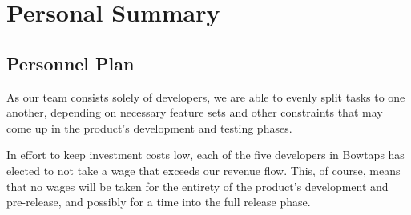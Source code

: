 

\chapter{Personal Summary}

\section{Personnel Plan}

As our team consists solely of developers, we are able to evenly split tasks to one another, depending on necessary feature sets and other constraints that may come up in the product’s development and testing phases.

In effort to keep investment costs low, each of the five developers in Bowtaps has elected to not take a wage that exceeds our revenue flow. This, of course, means that no wages will be taken for the entirety of the product’s development and pre-release, and possibly for a time into the full release phase.








